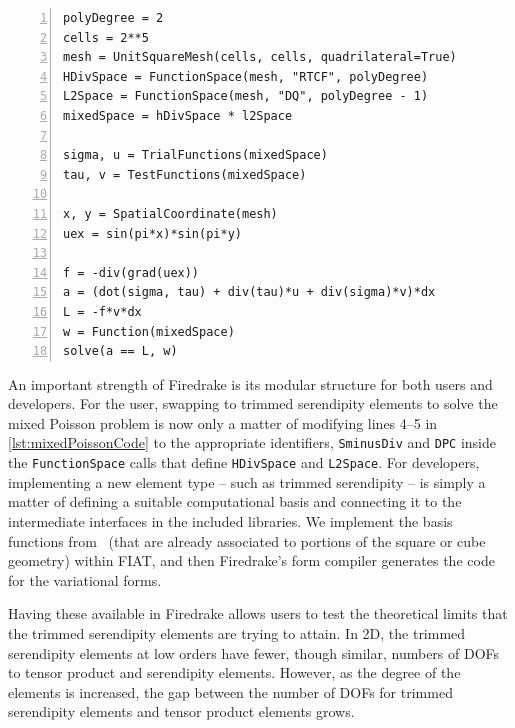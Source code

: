 \documentclass[format=acmsmall,screen,timestamp=false,a4paper]{acmart}
\newcommand\akg[1]{\textbf{\textcolor[rgb]{.5,0,1}{[Andrew: #1]}}}
\newcommand\josh[1]{\textbf{\textcolor[rgb]{0,.5,1}{[Josh: #1]}}}
\begin{document}
  
\begin{lstlisting}[float=htpb,caption={Basic Firedrake implementation of the mixed Poisson problem showcasing where to choose the elements that are used and how to create the equations in Firedrake's notation.}, label={lst:mixedPoissonCode}, numbers=left, firstnumber=1, xleftmargin=20pt,  xrightmargin=20pt]
polyDegree = 2
cells = 2**5
mesh = UnitSquareMesh(cells, cells, quadrilateral=True)
HDivSpace = FunctionSpace(mesh, "RTCF", polyDegree)
L2Space = FunctionSpace(mesh, "DQ", polyDegree - 1)
mixedSpace = hDivSpace * l2Space

sigma, u = TrialFunctions(mixedSpace)
tau, v = TestFunctions(mixedSpace)

x, y = SpatialCoordinate(mesh)
uex = sin(pi*x)*sin(pi*y)

f = -div(grad(uex))
a = (dot(sigma, tau) + div(tau)*u + div(sigma)*v)*dx
L = -f*v*dx
w = Function(mixedSpace)
solve(a == L, w)
\end{lstlisting}


  
  
An important strength of Firedrake is its modular structure for both users and developers.
For the user, swapping to trimmed serendipity elements to solve the mixed Poisson problem is now only a matter of modifying lines 4--5 in \cref{lst:mixedPoissonCode} to the appropriate identifiers, \texttt{SminusDiv} and \texttt{DPC} inside the \texttt{FunctionSpace} calls that define \texttt{HDivSpace} and \texttt{L2Space}.
   For developers, implementing a new element type -- such as trimmed serendipity -- is simply a matter of defining a suitable computational basis and connecting it to the intermediate interfaces in the included libraries.  We implement the basis functions from~\cite{gillette2019computational} (that are already associated to portions of the square or cube geometry) within FIAT, and then Firedrake's form compiler generates the code for the variational forms.
   
   Having these available in Firedrake allows users to test the theoretical limits that the trimmed serendipity elements are trying to attain.  In 2D, the trimmed serendipity elements at low orders have fewer, though similar, numbers of DOFs to tensor product and serendipity elements.  However, as the degree of the elements is increased, the gap between the number of DOFs for trimmed serendipity elements and tensor product elements grows.  
   
\end{document}
